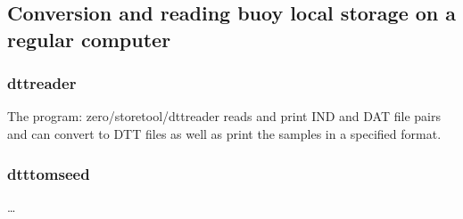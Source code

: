 \documentclass[a4paper]{article}
\begin{document}
\begin{multicols}{2}
  \subsection{Conversion and reading buoy local storage on a regular
  computer}

  \subsubsection{dttreader}
  The program: zero/storetool/dttreader reads and print IND and DAT file pairs
  and can convert to DTT files as well as print the samples in a
  specified format.

  \subsubsection{dtttomseed} \dots

\vspace{5em}
\printbibliography
\end{multicols}
\end{document}
